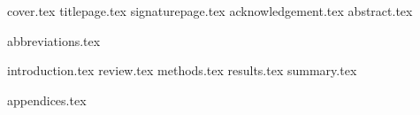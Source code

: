 \documentclass[12pt, oneside]{book}
\begin{document}
\frontmatter
	{cover.tex}
	{titlepage.tex}
	{signaturepage.tex}
	{acknowledgement.tex}
	{abstract.tex}

	
	\cleardoublepage
	\tableofcontents
	
	\cleardoublepage
	\listoffigures
	
	\cleardoublepage
	\listoftables
	
	\cleardoublepage
	\listofplates
	
	\cleardoublepage
	\renewcommand{\listAppendixname}{List of Appendices}
	\listofAppendix
	
	{abbreviations.tex}


\mainmatter
{
	{introduction.tex}
	{review.tex}
	{methods.tex}
	{results.tex}
	{summary.tex}
}

\nocite{*}
\printbibliography[title=References]

\clearpage
\pagestyle{plain}


	{appendices.tex}


\end{document}
